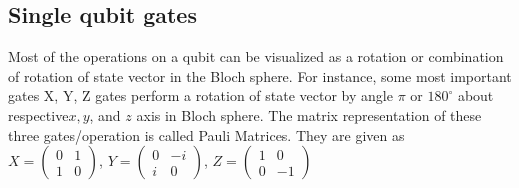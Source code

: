 \subsection{Single qubit gates}
Most of the operations on a qubit can be visualized as a rotation or combination of rotation of state vector in the Bloch sphere. For instance, some most important gates X, Y, Z gates perform a rotation of state vector by angle $\pi$ or $180^{\circ}$ about respective$ x, y$, and $z$ axis in Bloch sphere. The matrix representation of these three gates/operation is called Pauli Matrices. They are given as
\\$X = \begin{pmatrix}0 &1 \\ 1 &0 \end{pmatrix}$, 
$Y = \begin{pmatrix}0 &-i \\ i &0 \end{pmatrix}$, 
$Z = \begin{pmatrix}1 &0 \\ 0 &-1 \end{pmatrix}$
